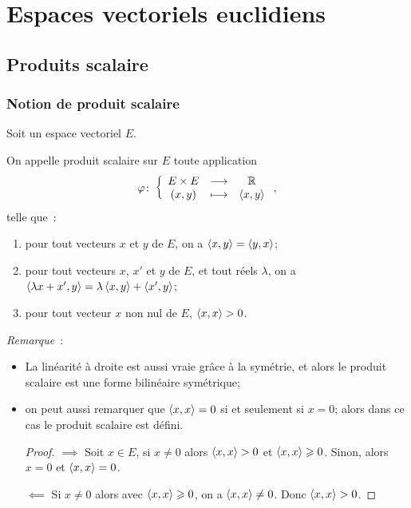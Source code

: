 \chapter{Espaces vectoriels euclidiens}
\label{chap:espaceseuclidiens}
\minitoc
\minilof
\minilot

\section{Produits scalaire}

\subsection{Notion de produit scalaire}

Soit un espace vectoriel \(E\).
\begin{defdef}
  On appelle produit scalaire sur \(E\) toute application
  \begin{equation}
    \varphi\colon \left\{\begin{array}{ccc} E \times E & \longrightarrow &\mathbb{R}\\ (x,y) & \longmapsto & \left\langle{x},{y}\right\rangle \end{array} \right.,
  \end{equation}
  telle que~:
  \begin{enumerate}
    \item pour tout vecteurs \(x\) et \(y\) de \(E\), on a \(\left\langle{x},{y}\right\rangle=\left\langle{y},{x}\right\rangle\);
    \item pour tout vecteurs \(x\), \(x'\) et \(y\) de \(E\), et tout réels \(\lambda\), on a \(\left\langle{\lambda x +x'},{y}\right\rangle = \lambda\left\langle{x},{y}\right\rangle + \left\langle{x'},{y}\right\rangle\);
    \item pour tout vecteur \(x\) non nul de \(E\), \(\left\langle{x},{x}\right\rangle>0\).
  \end{enumerate}
\end{defdef}
\emph{Remarque}~:
\begin{itemize}
  \item La linéarité à droite est aussi vraie grâce à la symétrie, et alors le produit scalaire est une forme bilinéaire symétrique;
  \item on peut aussi remarquer que \(\left\langle{x},{x}\right\rangle=0\) si et seulement si \(x=0\); alors dans ce cas le produit scalaire est défini.
    \begin{proof}
      \(\implies\) Soit \(x \in E\), si \(x\neq 0\) alors \(\left\langle{x},{x}\right\rangle>0\) et \(\left\langle{x},{x}\right\rangle\geqslant 0\). Sinon, alors \(x=0\) et \(\left\langle{x},{x}\right\rangle=0\).

      \(\impliedby\) Si \(x \neq 0\) alors avec \(\left\langle{x},{x}\right\rangle\geqslant 0\), on a \(\left\langle{x},{x}\right\rangle \neq 0\). Donc \(\left\langle{x},{x}\right\rangle>0\).
    \end{proof}
\end{itemize}

